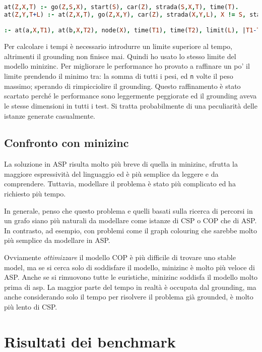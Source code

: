 \documentclass[11pt, a4paper]{article}
\begin{document}
\begin{lstlisting}[language=prolog]
at(Z,X,T) :- go(Z,S,X), start(S), car(Z), strada(S,X,T), time(T).
at(Z,Y,T+L) :- at(Z,X,T), go(Z,X,Y), car(Z), strada(X,Y,L), X != S, start(S), time(T), time(L).

:- at(a,X,T1), at(b,X,T2), node(X), time(T1), time(T2), limit(L), |T1-T2| <= L, x != S, start(S).
\end{lstlisting}

Per calcolare i tempi è necessario introdurre un limite superiore al tempo, altrimenti il grounding non finisce mai. Quindi ho usato lo stesso limite del modello minizinc.
Per migliorare le performance ho provato a raffinare un po' il limite prendendo il minimo tra: la somma di tutti i pesi, ed \lstinline{n} volte il peso massimo; sperando di rimpicciolire il grounding.
Questo raffinamento è stato scartato perché le performance sono leggermente peggiorate ed il grounding aveva le stesse dimensioni in tutti i test. Si tratta probabilmente di una peculiarità delle istanze generate casualmente.

\subsection{Confronto con minizinc}

La soluzione in ASP risulta molto più breve di quella in minizinc, sfrutta la maggiore espressività del linguaggio ed è più semplice da leggere e da comprendere.
Tuttavia, modellare il problema è stato più complicato ed ha richiesto più tempo.

In generale, penso che questo problema e quelli basati sulla ricerca di percorsi in un grafo siano più naturali da modellare come istanze di CSP o COP che di ASP.
In contrasto, ad esempio, con problemi come il graph colouring che sarebbe molto più semplice da modellare in ASP.

Ovviamente \emph{ottimizzare} il modello COP è più difficile di trovare uno stable model, ma se si cerca solo di soddisfare il modello, minizinc è molto più veloce di ASP.
Anche se si rimuovono tutte le euristiche, minizinc soddisfa il modello molto prima di asp.
La maggior parte del tempo in realtà è occupata dal grounding, ma anche considerando solo il tempo per risolvere il problema già grounded, è molto più lento di CSP.

\section{Risultati dei benchmark}
\end{document}
